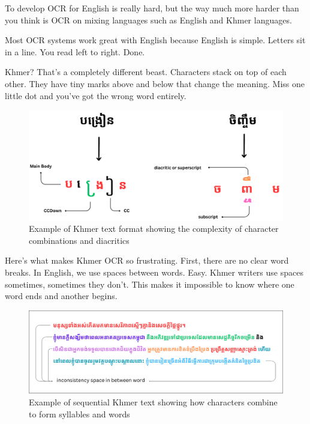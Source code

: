 To develop OCR for English is really hard, but the way much more harder than you think is 
OCR on mixing languages such as English and Khmer languages. 

Most OCR systems work great with English because English is simple. Letters sit 
in a line. You read left to right. Done.

Khmer? That's a completely different beast. Characters stack on top of each other. 
They have tiny marks above and below that change the meaning. Miss one little dot 
and you've got the wrong word entirely.

\begin{figure}[H]
    \centering
    \includegraphics[width=\textwidth]{figures/example_of_text_format.png}
    \caption{Example of Khmer text format showing the complexity of character combinations and diacritics}
    \label{fig:text_format}
\end{figure}

Here's what makes Khmer OCR so frustrating. First, there are no clear word breaks. In English, we use spaces between words. Easy. Khmer writers use spaces sometimes, sometimes they don't. This makes it impossible to know where one word ends and another begins.

\begin{figure}[H]
    \centering
    \includegraphics[width=\textwidth]{figures/example_of_long_text.png}
    \caption{Example of sequential Khmer text showing how characters combine to form syllables and words}
    \label{fig:sequential_text}
\end{figure}

